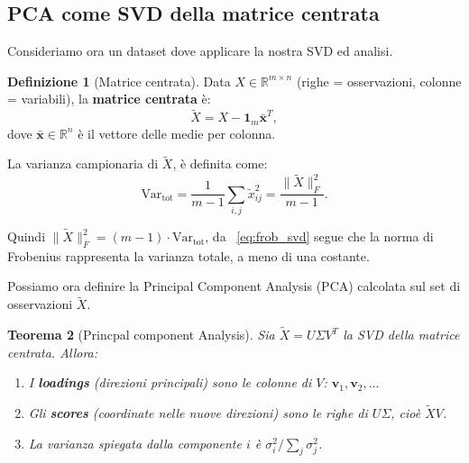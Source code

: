 \documentclass[11pt,a4paper]{article}
\theoremstyle{plain}
\newtheorem{teorema}{Teorema}[section]
\theoremstyle{definition}
\newtheorem{definizione}[teorema]{Definizione}
\theoremstyle{remark}
\begin{document}
\subsection{PCA come SVD della matrice centrata}

Consideriamo ora un dataset dove applicare la nostra SVD ed analisi.


\begin{definizione}[Matrice centrata]
Data $X \in \mathbb{R}^{m \times n}$ (righe = osservazioni, colonne = variabili),
la \textbf{matrice centrata} è:
\[
  \tilde{X} = X - \mathbf{1}_m \bar{\mathbf{x}}^T,
\]
dove $\bar{\mathbf{x}} \in \mathbb{R}^n$ è il vettore delle medie per colonna.
\end{definizione}

La varianza campionaria di $\tilde{X}$, è definita come:
\begin{equation}
      \text{Var}_{\text{tot}} = \frac{1}{m-1} \sum_{i,j} \tilde{x}_{ij}^2
  = \frac{\|\tilde{X}\|_F^2}{m-1}. \label{eq:var1}
\end{equation}


Quindi $\|\tilde{X}\|_F^2 = (m{-}1) \cdot \text{Var}_{\text{tot}}$, da ~\eqref{eq:frob_svd} segue che la norma di
Frobenius rappresenta la varianza totale, a meno di una costante.

Possiamo ora definire la Principal Component Analysis (PCA) calcolata sul set di osservazioni  $\tilde{X}$.

\begin{teorema}[Princpal component Analysis]
\label{thm:pca}
Sia $\tilde{X} = U \Sigma V^T$ la SVD della matrice centrata. Allora:
\begin{enumerate}
  \item I \textbf{loadings} (direzioni principali) sono le colonne di $V$:
        $\mathbf{v}_1, \mathbf{v}_2, \ldots$
  \item Gli \textbf{scores} (coordinate nelle nuove direzioni) sono le righe
        di $U\Sigma$, cioè $\tilde{X} V$.
  \item La varianza spiegata dalla componente $i$ è
        $\sigma_i^2 / \sum_j \sigma_j^2$.
\end{enumerate}
\end{teorema}
\end{document}
